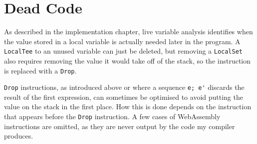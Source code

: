 \section{Dead Code}
As described in the implementation chapter, live variable analysis identifies when the value stored in a local variable is actually needed later in the program.
A \verb|LocalTee| to an unused variable can just be deleted, but removing a \verb|LocalSet| also requires removing the value it would take off of the stack, so the instruction is replaced with a \verb|Drop|.

\verb|Drop| instructions, as introduced above or where a sequence \verb|e; e'| discards the result of the first expression, can sometimes be optimised to avoid putting the value on the stack in the first place. How this is done depends on the instruction that appears before the \verb|Drop| instruction. A few cases of WebAssembly instructions are omitted, as they are never output by the code my compiler produces.

